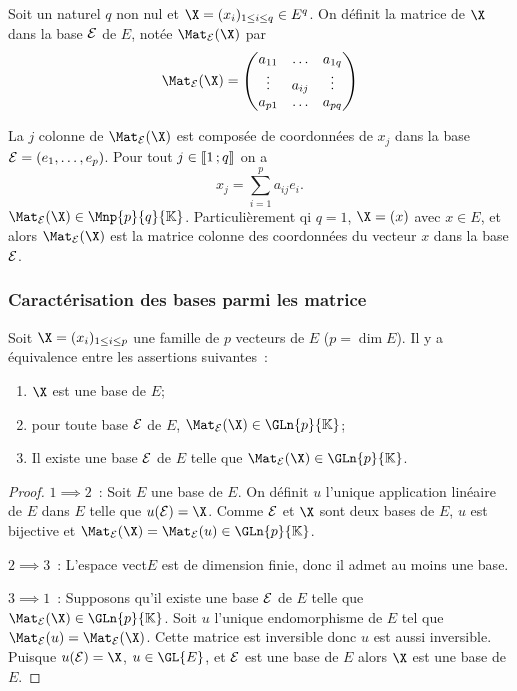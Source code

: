 \begin{defdef}
  Soit un naturel $q$ non nul et $\X=(x_i)_{1 \leq i \leq q} \in E^q$. On définit la matrice de $\X$ dans la base $\mathcal{E}$ de $E$, notée $\Mat_\E(\X)$ par
  \begin{equation}
    \Mat_{\E}(\X) =
    \begin{pmatrix}
      a_{11} & \ldots & a_{1q} \\
      \vdots & a_{ij} & \vdots \\
      a_{p1} & \ldots & a_{pq}
    \end{pmatrix}
  \end{equation}

  La $j$\ieme{} colonne de $\Mat_{\E}(\X)$ est composée de coordonnées de $x_j$ dans la base $\mathcal{E}=(e_1, \ldots, e_p)$. Pour tout $j \in \mathopen{\llbracket}1\mathclose{}\mathpunct{};q\mathclose{\rrbracket}$ on a
  \begin{equation}
    x_j = \sum_{i=1}^p a_{ij}e_i.
  \end{equation}
  $\Mat_{\E}(\X) \in \Mnp{p}{q}{\K}$. Particulièrement qi $q=1$, $\X=(x)$ avec $x \in E$, et alors $\Mat_{\E}(\X)$ est la matrice colonne des coordonnées du vecteur $x$ dans la base $\mathcal{E}$.
\end{defdef}

\subsubsection{Caractérisation des bases parmi les matrice}

\begin{theo}
  Soit $\X=(x_i)_{1 \leq i\leq p}$ une famille de $p$ vecteurs de $E$ ($p=\dim E$). Il y a équivalence entre les assertions suivantes~:
  \begin{enumerate}
  \item $\X$ est une base de $E$;
  \item pour toute base $\mathcal{E}$ de $E$, $\Mat_\E(\X) \in \GLn{p}{\K}$;
  \item Il existe une base $\mathcal{E}$ de $E$ telle que $\Mat_\E(\X) \in \GLn{p}{\K}$.
  \end{enumerate}
\end{theo}
\begin{proof}
  $1 \implies 2$~: Soit $E$ une base de $E$. On définit $u$ l'unique application linéaire de $E$ dans $E$ telle que $u(\E)=\X$. Comme $\mathcal{E}$ et $\X$ sont deux bases de $E$, $u$ est bijective et $\Mat_\E(\X)=\Mat_\E(u) \in \GLn{p}{\K}$.

  $2 \implies 3$~: L'espace vect$E$ est de dimension finie, donc il admet au moins une base.

  $3 \implies 1$~: Supposons qu'il existe une base $\mathcal{E}$ de $E$ telle que $\Mat_\E(\X) \in \GLn{p}{\K}$. Soit $u$ l'unique endomorphisme de $E$ tel que $\Mat_\E(u)=\Mat_\E(\X)$. Cette matrice est inversible donc $u$ est aussi inversible. Puisque $u(\E)=\X$, $u \in \GL{E}$, et $\mathcal{E}$ est une base de $E$ alors $\X$ est une base de $E$.
\end{proof}


